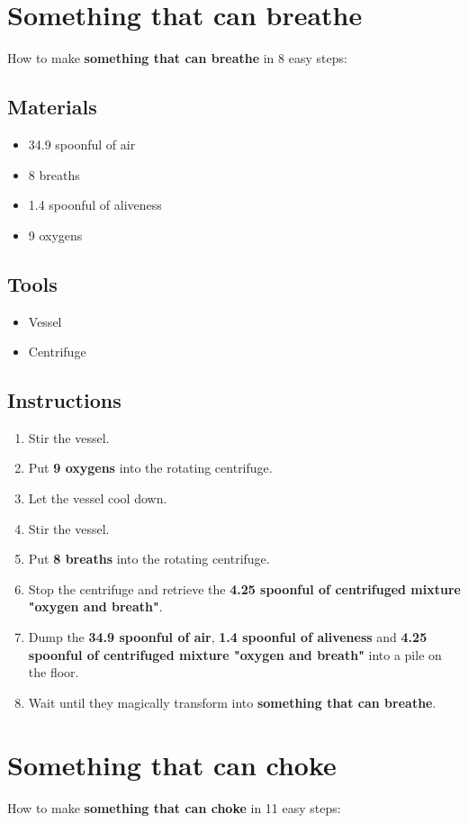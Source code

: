 \documentclass{article}
\begin{document}
\section{Something that can breathe}How to make \textbf{something that can breathe} in 8 easy steps:

\subsection{Materials}\begin{itemize}
\item 
34.9 spoonful of air
\item 
8 breaths
\item 
1.4 spoonful of aliveness
\item 
9 oxygens
\end{itemize}
\subsection{Tools}\begin{itemize}
\item 
Vessel
\item 
Centrifuge
\end{itemize}
\subsection{Instructions}\begin{enumerate}
\item 
Stir the vessel.
\item 
Put \textbf{9 oxygens} into the rotating centrifuge.
\item 
Let the vessel cool down.
\item 
Stir the vessel.
\item 
Put \textbf{8 breaths} into the rotating centrifuge.
\item 
Stop the centrifuge and retrieve the \textbf{4.25 spoonful of centrifuged mixture "oxygen and breath"}.
\item 
Dump the \textbf{34.9 spoonful of air}, \textbf{1.4 spoonful of aliveness} and \textbf{4.25 spoonful of centrifuged mixture "oxygen and breath"} into a pile on the floor.
\item 
Wait until they magically transform into \textbf{something that can breathe}.
\end{enumerate}
\newpage
\section{Something that can choke}How to make \textbf{something that can choke} in 11 easy steps:
\end{document}
